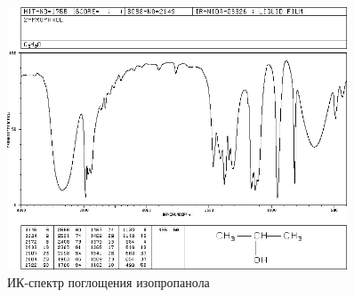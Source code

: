 \begin{figure}[h!]
	\centering
	\includegraphics[width=0.9\textwidth]{data/propanol_real}
	\caption{ИК-спектр поглощения изопропанола}
	\label{propanol_real}
\end{figure}

